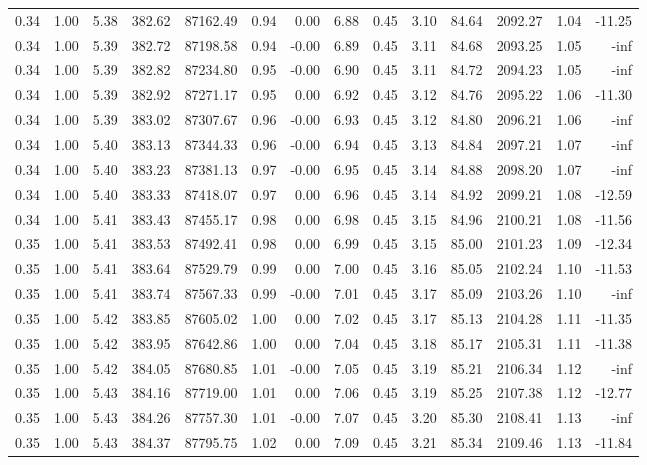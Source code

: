 \begin{table}[!ht]
\begin{tabular}{rrrrrrrrrrrrrr}
0.34 & 1.00 & 5.38 & 382.62 & 87162.49 & 0.94 & 0.00 & 6.88 & 0.45 & 3.10 & 84.64 & 2092.27 & 1.04 & -11.25 \\
0.34 & 1.00 & 5.39 & 382.72 & 87198.58 & 0.94 & -0.00 & 6.89 & 0.45 & 3.11 & 84.68 & 2093.25 & 1.05 & -inf \\
0.34 & 1.00 & 5.39 & 382.82 & 87234.80 & 0.95 & -0.00 & 6.90 & 0.45 & 3.11 & 84.72 & 2094.23 & 1.05 & -inf \\
0.34 & 1.00 & 5.39 & 382.92 & 87271.17 & 0.95 & 0.00 & 6.92 & 0.45 & 3.12 & 84.76 & 2095.22 & 1.06 & -11.30 \\
0.34 & 1.00 & 5.39 & 383.02 & 87307.67 & 0.96 & -0.00 & 6.93 & 0.45 & 3.12 & 84.80 & 2096.21 & 1.06 & -inf \\
0.34 & 1.00 & 5.40 & 383.13 & 87344.33 & 0.96 & -0.00 & 6.94 & 0.45 & 3.13 & 84.84 & 2097.21 & 1.07 & -inf \\
0.34 & 1.00 & 5.40 & 383.23 & 87381.13 & 0.97 & -0.00 & 6.95 & 0.45 & 3.14 & 84.88 & 2098.20 & 1.07 & -inf \\
0.34 & 1.00 & 5.40 & 383.33 & 87418.07 & 0.97 & 0.00 & 6.96 & 0.45 & 3.14 & 84.92 & 2099.21 & 1.08 & -12.59 \\
0.34 & 1.00 & 5.41 & 383.43 & 87455.17 & 0.98 & 0.00 & 6.98 & 0.45 & 3.15 & 84.96 & 2100.21 & 1.08 & -11.56 \\
0.35 & 1.00 & 5.41 & 383.53 & 87492.41 & 0.98 & 0.00 & 6.99 & 0.45 & 3.15 & 85.00 & 2101.23 & 1.09 & -12.34 \\
0.35 & 1.00 & 5.41 & 383.64 & 87529.79 & 0.99 & 0.00 & 7.00 & 0.45 & 3.16 & 85.05 & 2102.24 & 1.10 & -11.53 \\
0.35 & 1.00 & 5.41 & 383.74 & 87567.33 & 0.99 & -0.00 & 7.01 & 0.45 & 3.17 & 85.09 & 2103.26 & 1.10 & -inf \\
0.35 & 1.00 & 5.42 & 383.85 & 87605.02 & 1.00 & 0.00 & 7.02 & 0.45 & 3.17 & 85.13 & 2104.28 & 1.11 & -11.35 \\
0.35 & 1.00 & 5.42 & 383.95 & 87642.86 & 1.00 & 0.00 & 7.04 & 0.45 & 3.18 & 85.17 & 2105.31 & 1.11 & -11.38 \\
0.35 & 1.00 & 5.42 & 384.05 & 87680.85 & 1.01 & -0.00 & 7.05 & 0.45 & 3.19 & 85.21 & 2106.34 & 1.12 & -inf \\
0.35 & 1.00 & 5.43 & 384.16 & 87719.00 & 1.01 & 0.00 & 7.06 & 0.45 & 3.19 & 85.25 & 2107.38 & 1.12 & -12.77 \\
0.35 & 1.00 & 5.43 & 384.26 & 87757.30 & 1.01 & -0.00 & 7.07 & 0.45 & 3.20 & 85.30 & 2108.41 & 1.13 & -inf \\
0.35 & 1.00 & 5.43 & 384.37 & 87795.75 & 1.02 & 0.00 & 7.09 & 0.45 & 3.21 & 85.34 & 2109.46 & 1.13 & -11.84 \\

\end{tabular}
\end{table}
